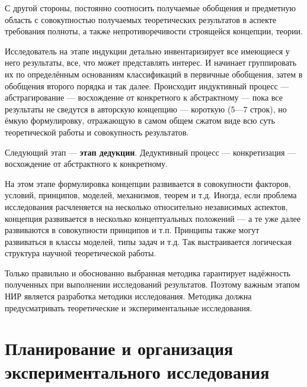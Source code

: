 С другой стороны, постоянно соотносить получаемые обобщения и
предметную область с совокупностью получаемых теоретических результатов в аспекте требования полноты, а также непротиворечивости
строящейся концепции, теории. \cite{lit6}

Исследователь на этапе индукции детально инвентаризирует все
имеющиеся у него результаты, все, что может представлять интерес.
И начинает группировать их по определённым основаниям классификаций в первичные обобщения, затем в обобщения второго порядка и так
далее. Происходит индуктивный процесс --- абстрагирование --- восхождение от конкретного к абстрактному --- пока все результаты не сведутся
в авторскую концепцию --- короткую (5---7 строк), но ёмкую формулировку, отражающую в самом общем сжатом виде всю суть теоретической
работы и совокупность результатов.  \cite{lit6}

Следующий этап --- \textbf{этап дедукции}. Дедуктивный процесс --- конкретизация --- восхождение от абстрактного к конкретному. \cite{lit6}

На этом этапе формулировка концепции развивается в совокупности факторов, условий, принципов, моделей, механизмов, теорем и т.д.
Иногда, если проблема исследования расчленяется на несколько относительно независимых аспектов, концепция развивается в несколько концептуальных положений --- а те уже далее развиваются в совокупности принципов и т.п. Принципы также могут развиваться в классы моделей, типы задач и т.д. Так выстраивается логическая структура научной теоретической работы. \cite{lit6}

Только правильно и обоснованно выбранная методика гарантирует
надёжность полученных при выполнении исследований результатов.
Поэтому важным этапом НИР является разработка методики исследования. Методика должна предусматривать теоретические и экспериментальные исследования.  \cite{lit6}



\section{Планирование и организация экспериментального исследования}




